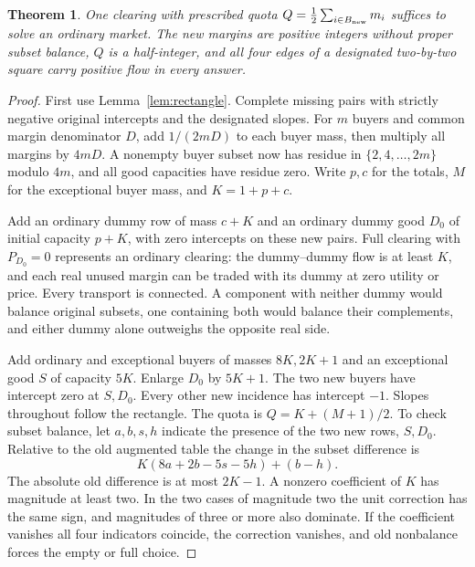 \documentclass[11pt,oneside,openany,notitlepage]{report}
\newtheorem{theorem}{Theorem}[chapter]
\begin{document}
\begin{theorem}\label{thm:halfquota}
One clearing with prescribed quota
\(Q=\tfrac12\sum_{i\in B_{\rm new}}m_i\) suffices to solve an ordinary
market. The new margins are positive integers without proper subset
balance, \(Q\) is a half-integer, and all four edges of a designated
two-by-two square carry positive flow in every answer.
\end{theorem}
\begin{proof}
First use Lemma~\ref{lem:rectangle}. Complete missing pairs with
strictly negative original intercepts and the designated slopes. For
\(m\) buyers and common margin denominator \(D\), add \(1/(2mD)\) to
each buyer mass, then multiply all margins by \(4mD\). A nonempty buyer
subset now has residue in \(\{2,4,\ldots,2m\}\) modulo \(4m\), and
all good capacities have residue zero. Write \(p,c\) for the totals,
\(M\) for the exceptional buyer mass, and \(K=1+p+c\).

Add an ordinary dummy row of mass \(c+K\) and an ordinary dummy good
\(D_0\) of initial capacity \(p+K\), with zero intercepts on these new
pairs. Full clearing with \(P_{D_0}=0\) represents an ordinary clearing:
the dummy--dummy flow is at least \(K\), and each real unused margin can
be traded with its dummy at zero utility or price. Every transport is
connected. A component with neither dummy would balance original subsets,
one containing both would balance their complements, and either dummy
alone outweighs the opposite real side.

Add ordinary and exceptional buyers of masses \(8K,2K+1\) and an
exceptional good \(S\) of capacity \(5K\). Enlarge \(D_0\) by \(5K+1\).
The two new buyers have intercept zero at \(S,D_0\). Every other new
incidence has intercept \(-1\). Slopes throughout follow the rectangle.
The quota is \(Q=K+(M+1)/2\). To check subset balance, let \(a,b,s,h\)
indicate the presence of the two new rows, \(S,D_0\). Relative to the old
augmented table the change in the subset difference is
\[
 K(8a+2b-5s-5h)+(b-h).
\]
The absolute old difference is at most \(2K-1\). A nonzero coefficient
of \(K\) has magnitude at least two. In the two cases of magnitude two
the unit correction has the same sign, and magnitudes of three or more
also dominate. If the coefficient vanishes all four indicators coincide,
the correction vanishes, and old nonbalance forces the empty or full
choice.


\end{proof}
\end{document}
